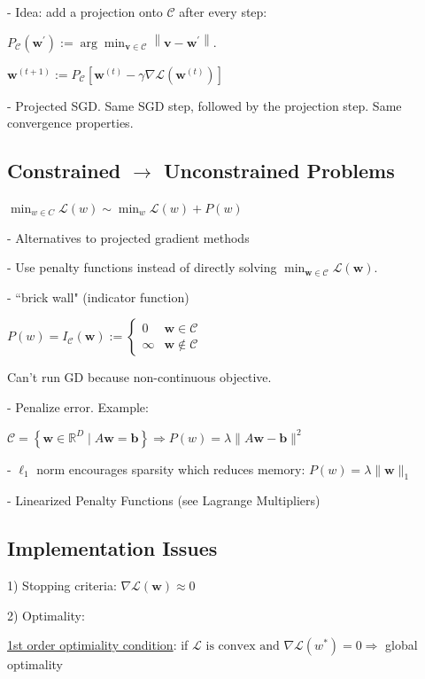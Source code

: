 - Idea: add a projection onto $\mathcal{C}$ after every step:

$
P_{\mathcal{C}}\left(\mathbf{w}^{\prime}\right):=\arg \min _{\mathbf{v} \in \mathcal{C}}\left\|\mathbf{v}-\mathbf{w}^{\prime}\right\| .
$

$
\mathbf{w}^{(t+1)}:=P_{\mathcal{C}}\left[\mathbf{w}^{(t)}-\gamma \nabla \mathcal{L}\left(\mathbf{w}^{(t)}\right)\right]
$

- Projected SGD. Same SGD step, followed by the projection step. Same convergence properties.

\subsection*{Constrained $\rightarrow$ Unconstrained Problems}

$\min_{w\in C}\mathcal{L}(w)\sim\min_{w}\mathcal{L}(w)+P(w)$

- Alternatives to projected gradient methods

- Use penalty functions instead of directly solving $\min _{\mathbf{w} \in \mathcal{C}} \mathcal{L}(\mathbf{w})$.

- ``brick wall" (indicator function)

$
P(w) = I_{\mathcal{C}}(\mathbf{w}):= \begin{cases}0 & \mathbf{w} \in \mathcal{C} \\
\infty & \mathbf{w} \notin \mathcal{C}\end{cases}
$

Can't run GD because non-continuous objective.

- Penalize error. Example:

$
\mathcal{C}=\left\{\mathbf{w} \in \mathbb{R}^{D} \mid A \mathbf{w}=\mathbf{b}\right\} \Rightarrow P(w) = \lambda\|A \mathbf{w}-\mathbf{b}\|^{2}
$

- $\ell_1$ norm encourages sparsity which reduces memory:
$
P(w) = \lambda\|\mathbf{w}\|_1
$

- Linearized Penalty Functions (see Lagrange Multipliers)

\subsection*{Implementation Issues}

1) Stopping criteria: $\nabla \mathcal{L}(\mathbf{w}) \approx 0$

2) Optimality: 

\underline{1st order optimiality condition}: 
if $\mathcal{L} \text{ is convex and } \nabla \mathcal{L}(w^*)=0 \Rightarrow$ global optimality

